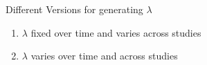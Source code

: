 \documentclass[english]{beamer}\usepackage[]{graphicx}\usepackage[]{xcolor}
\begin{document}
% 





\begin{frame}{Different Versions for generating $\lambda$}
\begin{enumerate}
\item $\lambda$ fixed over time and varies across studies
\item $\lambda$ varies over time and across studies
\end{enumerate}
\end{frame}
\end{document}
